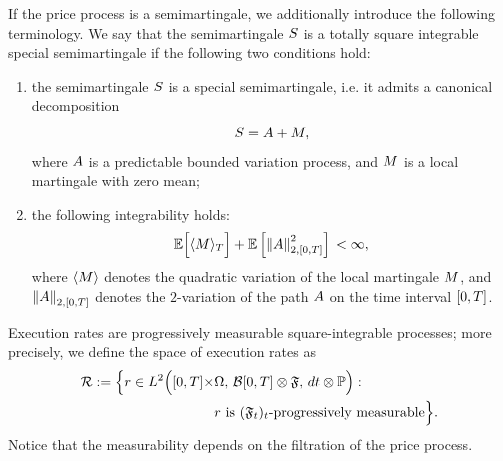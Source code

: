 \documentclass[10pt,a4paper]{article}
\begin{document}
	If the price process is a semimartingale, we additionally introduce the following terminology. We say that the semimartingale $\semimartingale$ is a totally square integrable special semimartingale if the following two conditions hold:
	\begin{enumerate}
		\item the semimartingale $\semimartingale$ is a special semimartingale, i.e. it admits a canonical decomposition 
		\begin{equation*}
		\semimartingale=\boundedVariationPart + \martingale,
		\end{equation*}
		where $\boundedVariationPart$ is a predictable bounded variation process, and $\martingale$ is a local martingale with zero mean;
		\item the following integrability holds:
		\begin{equation*}
		\Expectation \Big[ \langle \martingale \rangle_\timeHorizon  \Big] + \Expectation \left[ \norm[\boundedVariationPart]_{2,\timeWindow}\squared  \right] \, < \infty,
		\end{equation*}
		where $\langle \martingale \rangle$ denotes the quadratic variation of the local martingale $\martingale$, and $ \norm[\boundedVariationPart]_{2,\timeWindow}$ denotes the $2$-variation of the path $\boundedVariationPart$ on the time interval $\timeWindow$. 
	\end{enumerate}
	
	 
	 
	Execution rates are progressively measurable square-integrable processes; more precisely, we define the space of execution rates as
	\begin{equation}\label{eq.definitionOfSpaceExecutionRates}
	\begin{split}
	\spaceExecutionRates:= \Big\lbrace
	r \in \Ltwo\Big([0,T]\times& \Omega, \, \mathcal{B}[0,T]\otimes \sigmaAlgebra, \, dt\otimes \Prob\Big): \, \\
	&
	r \text{ is } (\sigmaAlgebra_t)_t\text{-progressively measurable}\Big\rbrace.
	\end{split}
	\end{equation}
	Notice that the measurability depends on the filtration of the price process. 
	
\end{document}
